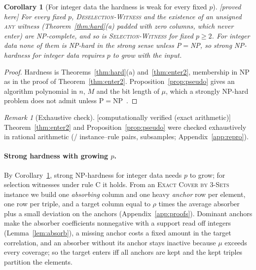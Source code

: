 \documentclass[10pt,a4paper]{article}
\theoremstyle{plain}
\newtheorem{corollary}[theorem]{Corollary}
\theoremstyle{definition}
\theoremstyle{remark}
\newtheorem{remark}[theorem]{Remark}
\newcommand{\status}[1]{\textnormal{\textsf{\small [#1]}}}
\newcommand{\tsc}[1]{\textnormal{\textsc{#1}}}  %
\begin{document}
\begin{corollary}[For integer data the hardness is weak for every fixed $p$]\label{cor:weak}\status{proved here}
For every fixed $p$, \tsc{Deselection-Witness} and the existence of an unsigned \tsc{any} witness (Theorem~\ref{thm:hard}(a) padded with zero columns, which never enter) are NP-complete, and so is \tsc{Selection-Witness} for fixed $p\ge2$. For integer data none of them is NP-hard in the strong sense unless P${}={}$NP, so strong NP-hardness for integer data requires $p$ to grow with the input.
\end{corollary}
\begin{proof}
Hardness is Theorems~\ref{thm:hard}(a) and~\ref{thm:enter2}, membership in NP as in the proof of Theorem~\ref{thm:enter2}. Proposition~\ref{prop:pseudo} gives an algorithm polynomial in $n$, $M$ and the bit length of $\mu$, which a strongly NP-hard problem does not admit unless P${}={}$NP~\citep{garey1979}.
\end{proof}

\begin{remark}[Exhaustive check]\label{rem:verify2}\status{computationally verified (exact arithmetic)}
Theorem~\ref{thm:enter2} and Proposition~\ref{prop:pseudo} were checked exhaustively in rational arithmetic (\HardEquivOk/\HardPairs{} instance--rule pairs, \HardSubsets{} subsamples; Appendix~\ref{app:repro}).
\end{remark}

\paragraph{Strong hardness with growing $p$.} By Corollary~\ref{cor:weak}, strong NP-hardness for integer data needs $p$ to grow; for selection witnesses under rule C it holds. From an \tsc{Exact Cover by 3-Sets} instance we build one \emph{absorbing} column and one heavy \emph{anchor} row per element, one row per triple, and a target column equal to $\rho$ times the average absorber plus a small deviation on the anchors (Appendix~\ref{app:proofs}). Dominant anchors make the absorber coefficients nonnegative with a support read off integers (Lemma~\ref{lem:absorb}), a missing anchor costs a fixed amount in the target correlation, and an absorber without its anchor stays inactive because $\mu$ exceeds every coverage; so the target enters iff all anchors are kept and the kept triples partition the elements.
\end{document}

